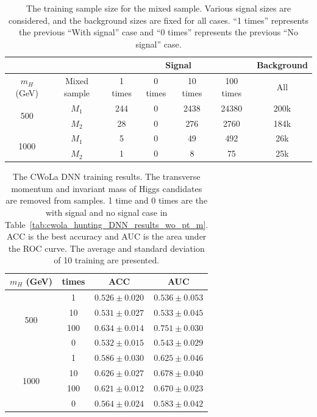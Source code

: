 \documentclass[12pt]{article}
\begin{document}
		\begin{table}[htpb]
			\centering
			\caption{The training sample size for the mixed sample. Various signal sizes are considered, and the background sizes are fixed for all cases. ``1 times'' represents the previous ``With signal'' case and ``0 times'' represents the previous ``No signal'' case.}
			\label{tab:training_sample_size_cwola_hunting_enlarge_signal_size}
			\begin{tabular}{c|c|cccc|c}
									  &              & \multicolumn{4}{c|}{Signal}              & Background \\ \hline
				$m_H$ (GeV)           & Mixed sample & 1 times & 0 times & 10 times & 100 times & All        \\ \hline
				\multirow{2}{*}{500}  & $M_1$        & 244     & 0       & 2438     & 24380     & 200k       \\
									  & $M_2$        & 28      & 0       & 276      & 2760      & 184k       \\ \hline
				\multirow{2}{*}{1000} & $M_1$        & 5       & 0       & 49       & 492       & 26k        \\
									  & $M_2$        & 1       & 0       & 8        & 75        & 25k       
			\end{tabular}
		\end{table}

		\begin{table}[htpb]
			\centering
			\caption{The CWoLa DNN training results. The transverse momentum and invariant mass of Higgs candidates are removed from samples. 1 time and 0 times are the with signal and no signal case in Table~\ref{tab:cwola_hunting_DNN_results_wo_pt_m}. ACC is the best accuracy and AUC is the area under the ROC curve. The average and standard deviation of 10 training are presented.}
			\label{tab:cwola_hunting_DNN_results_wo_pt_m_enlarge_signal_size}
			\begin{tabular}{c|c|cc}
				$m_H$ (GeV)           & times & ACC               & AUC               \\ \hline
				\multirow{4}{*}{500}  & 1     & $0.526 \pm 0.020$ & $0.536 \pm 0.053$ \\
									  & 10    & $0.531 \pm 0.027$ & $0.533 \pm 0.045$ \\
									  & 100   & $0.634 \pm 0.014$ & $0.751 \pm 0.030$ \\
									  & 0     & $0.532 \pm 0.015$ & $0.543 \pm 0.029$ \\ \hline
				\multirow{4}{*}{1000} & 1     & $0.586 \pm 0.030$ & $0.625 \pm 0.046$ \\
									  & 10    & $0.626 \pm 0.027$ & $0.678 \pm 0.040$ \\
									  & 100   & $0.621 \pm 0.012$ & $0.670 \pm 0.023$ \\
									  & 0     & $0.564 \pm 0.024$ & $0.583 \pm 0.042$
			\end{tabular}
		\end{table}
\end{document}

